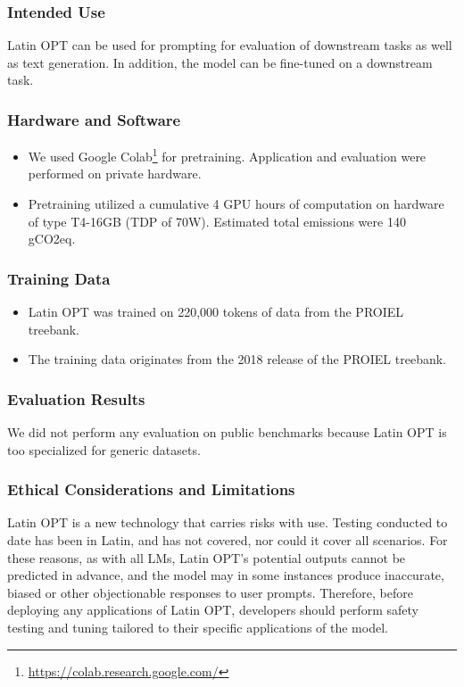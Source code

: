 \subsubsection{Intended Use}
Latin OPT can be used for prompting for evaluation of downstream tasks as well as text generation. In addition, the model can be fine-tuned on a downstream task.
\subsubsection{Hardware and Software}
\begin{itemize}[font=\bfseries]
    \item[Training Factors] We used Google Colab\footnote{\url{https://colab.research.google.com/}} for pretraining. Application and evaluation were performed on private hardware.
    \item[Carbon Footprint] Pretraining utilized a cumulative 4 GPU hours of computation on hardware of type T4-16GB (TDP of 70W). Estimated total emissions were 140 gCO2eq. 
\end{itemize}
\subsubsection{Training Data}
\begin{itemize}[font=\bfseries]
    \item[Overview] Latin OPT was trained on 220,000 tokens of data from the PROIEL treebank.
    \item[Data Freshness] The training data originates from the 2018 release of the PROIEL treebank. 
\end{itemize}
\subsubsection{Evaluation Results}
We did not perform any evaluation on public benchmarks because Latin OPT is too specialized for generic datasets.
\subsubsection{Ethical Considerations and Limitations}
Latin OPT is a new technology that carries risks with use. Testing conducted to date has been in Latin, and has not covered, nor could it cover all scenarios. For these reasons, as with all LMs, Latin OPT’s potential outputs cannot be predicted in advance, and the model may in some instances produce inaccurate, biased or other objectionable responses to user prompts. Therefore, before deploying any applications of Latin OPT, developers should perform safety testing and tuning tailored to their specific applications of the model.

